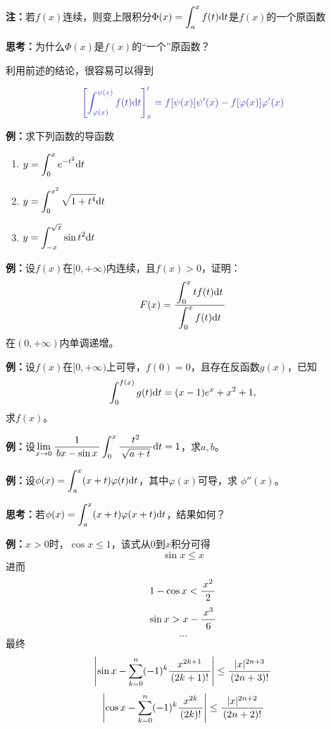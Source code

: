 {\bf 注：}若$f(x)$连续，则变上限积分$\Phi(x)=\displaystyle\int_a^xf(t)\mathrm{d} t$是$f(x)$的一个原函数

{\bf 思考：}为什么$\Phi(x)$是$f(x)$的“一个”原函数？

利用前述的结论，很容易可以得到

\begin{thx}
	$${\b\left[\dint_{\varphi(x)}^{\psi(x)}f(t)\d t\right]'_x
	=f[\psi(x)]\psi'(x)-f[\varphi(x)]\varphi'(x)}$$
\end{thx}

{\bf 例：}求下列函数的导函数
\begin{enumerate}[(1)]
  \setlength{\itemindent}{1cm}
  \item $y=\displaystyle\int_0^{x}e^{-t^2}\mathrm{d} t$
  \item $y=\displaystyle\int_0^{x^2}\sqrt{1+t^4}\mathrm{d} t$
  \item $y=\displaystyle\int_{-x}^{\sqrt x}\sin t^2\mathrm{d} t$
\end{enumerate}

{\bf 例：}设$f(x)$在$[0,+\infty)$内连续，且$f(x)>0$，证明：
$$F(x)=\displaystyle\frac{\,{\displaystyle\int_0^xtf(t)\mathrm{d} t}\,}{\,{\displaystyle\int_0^xf(t)\mathrm{d} t}\,}$$
在$(0,+\infty)$内单调递增。

{\bf 例：}设$f(x)$在$[0,+\infty)$上可导，$f(0)=0$，且存在反函数$g(x)$，已知
$$\displaystyle\int_0^{f(x)}g(t)\mathrm{d} t=(x-1)e^x+x^2+1,$$
求$f(x)$。

{\bf 例：}设$\lim\limits_{x\to{0}}\displaystyle\frac{\,{1}\,}{\,{bx-\sin
x}\,}\displaystyle\int_0^x\displaystyle\frac{\,{t^2}\,}{\,{\sqrt{a+t}}\,}\mathrm{d} t=1$，求$a,b$。

{\bf 例：}设$\phi(x)=\displaystyle\int_a^x(x+t)\varphi(t)\mathrm{d} t$，其中$\varphi(x)$可导，求
$\phi''(x)$。

{\bf 思考：}若$\phi(x)=\displaystyle\int_a^x(x+t)\varphi(x+t)\mathrm{d} t$，结果如何？

{\bf 例：}$x>0$时，$\cos x\leq 1$，该式从$0$到$x$积分可得
$$\sin x\leq x$$
进而
$$1-\cos x<\displaystyle\frac{\,{x^2}\,}{\,{2}\,}$$
$$\sin x>x-\displaystyle\frac{\,{x^3}\,}{\,{6}\,}$$
$$\ldots$$
最终
$$\left|\sin x-\sum\limits_{k=0}^n(-1)^k\displaystyle\frac{\,{x^{2k+1}}\,}{\,{(2k+1)!}\,}\right|
\leq\displaystyle\frac{\,{|x|^{2n+3}}\,}{\,{(2n+3)!}\,}$$
$$\left|\cos x-\sum\limits_{k=0}^n(-1)^k\displaystyle\frac{\,{x^{2k}}\,}{\,{(2k)!}\,}\right|
\leq\displaystyle\frac{\,{|x|^{2n+2}}\,}{\,{(2n+2)!}\,}$$

